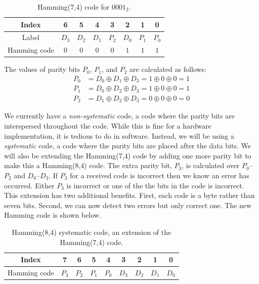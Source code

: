 \documentclass[11pt]{article}
\begin{document}
\begin{table}[h]
  \centering
  \begin{tabular}{ |c|c|c|c|c|c|c|c| }
    \hline
    Index & 6 & 5 & 4 & 3 & 2 & 1 & 0 \\
    \hline \hline
    Label & $D_3$ & $D_2$ & $D_1$ & $P_2$ & $D_0$ & $P_1$ & $P_0$ \\
    \hline
    Hamming code & $0$ & $0$ & $0$ & $0$ & $1$ & $1$ & $1$ \\
    \hline
  \end{tabular}
  \caption{Hamming(7,4) code for $0001_2$.}
  \label{ham7,4-ex}
\end{table}

\noindent The values of parity bits $P_0$, $P_1$, and $P_2$ are
calculated as follows:
\begin{equation*}
  \begin{split}
    P_0 &= D_0 \oplus D_1 \oplus D_3 = 1 \oplus 0 \oplus 0 = 1 \\
    P_1 &= D_0 \oplus D_2 \oplus D_3 = 1 \oplus 0 \oplus 0 = 1 \\
    P_2 &= D_1 \oplus D_2 \oplus D_3 = 0 \oplus 0 \oplus 0 = 0
  \end{split}
\end{equation*}

We currently have a \emph{non-systematic} code, a code where the parity
bits are interspersed throughout the code. While this is fine for a
hardware implementation, it is tedious to do in software.  Instead, we
will be using a \emph{systematic} code, a code where the parity bits are
placed after the data bits. We will also be extending the Hamming(7,4)
code by adding one more parity bit to make this a Hamming(8,4) code. The
extra parity bit, $P_3$, is calculated over $P_0$--$P_2$ and
$D_0$--$D_3$. If $P_3$ for a received code is incorrect then we know an
error has occurred. Either $P_3$ is incorrect or one of the the bits in
the code is incorrect. This extension has two additional benefits.
First, each code is a byte rather than seven bits. Second, we can now
detect two errors but only correct one. The new Hamming code is shown
below.

\begin{table}[h]
  \centering
  \begin{tabular}{ |c|c|c|c|c|c|c|c|c| }
    \hline
    Index & 7 & 6 & 5 & 4 & 3 & 2 & 1 & 0 \\
    \hline
    \hline
    Hamming code & $P_3$ & $P_2$ & $P_1$ & $P_0$ & $D_3$ & $D_2$ & $D_1$ & $D_0$ \\
    \hline
  \end{tabular}
  \caption{Hamming(8,4) systematic code, an extension of the Hamming(7,4) code.}
  \label{ham8,4}
\end{table}
\end{document}
